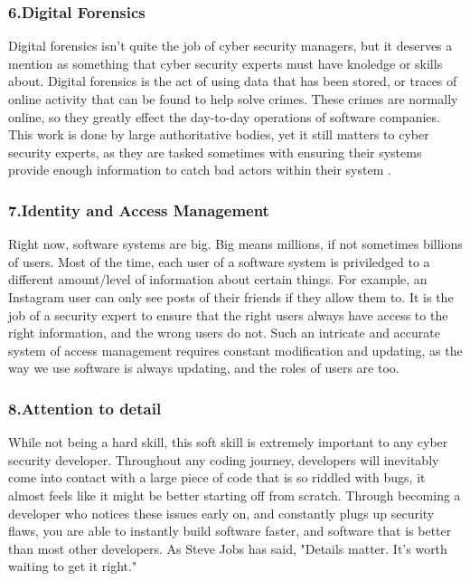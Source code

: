 \documentclass[a4paper, 11pt]{report}
\begin{document}
    \subsubsection{6.Digital Forensics}
    Digital forensics isn't quite the job of cyber security managers, but it deserves a mention as something that cyber security experts must have knoledge or skills about. Digital forensics is the act of using data that has been stored, or traces of online activity that can be found to help solve crimes. These crimes are normally online, so they greatly effect the day-to-day operations of software companies. This work is done by large authoritative bodies, yet it still matters to cyber security experts, as they are tasked sometimes with ensuring their systems provide enough information to catch bad actors within their system \cite{jake6}.
    \subsubsection{7.Identity and Access Management}
    Right now, software systems are big. Big means millions, if not sometimes billions of users. Most of the time, each user of a software system is priviledged to a different amount/level of information about certain things. For example, an Instagram user can only see posts of their friends if they allow them to. It is the job of a security expert to ensure that the right users always have access to the right information, and the wrong users do not. Such an intricate and accurate system of access management requires constant modification and updating, as the way we use software is always updating, and the roles of users are too.
    \subsubsection{8.Attention to detail}
    While not being a hard skill, this soft skill is extremely important to any cyber security developer. Throughout any coding journey, developers will inevitably come into contact with a large piece of code that is so riddled with bugs, it almost feels like it might be better starting off from scratch. Through becoming a developer who notices these issues early on, and constantly plugs up security flaws, you are able to instantly build software faster, and software that is better than most other developers. As Steve Jobs has said, "Details matter. It's worth waiting to get it right." \cite{jake7}


\end{document}
